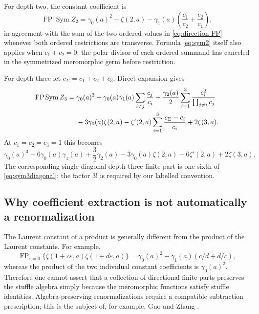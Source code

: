 \documentclass[11pt,letterpaper]{article}
\numberwithin{equation}{section}
\theoremstyle{plain}
\theoremstyle{definition}
\theoremstyle{remark}
\DeclareMathOperator{\FP}{FP}
\DeclareMathOperator{\Sym}{Sym}
\newcommand{\eps}{\varepsilon}
\begin{document}
For depth two, the constant coefficient is
\begin{equation}\label{eq:sym2}
 \FP\Sym Z_2
 =\gamma_0(a)^2-\zeta(2,a)
        -\gamma_1(a)\left(\frac{c_1}{c_2}+\frac{c_2}{c_1}\right),
\end{equation}
in agreement with the sum of the two ordered values in
\eqref{eq:direction-FP} whenever both ordered restrictions are
transverse. Formula \eqref{eq:sym2} itself also applies when
$c_1+c_2=0$: the polar divisor of each ordered summand has canceled
in the symmetrized meromorphic germ before restriction.

For depth three let $c_\Sigma=c_1+c_2+c_3$. Direct expansion gives
\begin{align}\label{eq:sym3}
 \FP\Sym Z_3={}&\gamma_0(a)^3
   -\gamma_0(a)\gamma_1(a)\sum_{i\ne j}\frac{c_j}{c_i}
   +\frac{\gamma_2(a)}2\sum_{i=1}^3
                         \frac{c_i^2}{\prod_{j\ne i}c_j}\notag\\
 &-3\gamma_0(a)\zeta(2,a)
   -\zeta'(2,a)\sum_{i=1}^3\frac{c_\Sigma-c_i}{c_i}
   +2\zeta(3,a).
\end{align}
At $c_1=c_2=c_3=1$ this becomes
\begin{equation}\label{eq:sym3diagonal}
 \gamma_0(a)^3-6\gamma_0(a)\gamma_1(a)+\frac32\gamma_2(a)
 -3\gamma_0(a)\zeta(2,a)-6\zeta'(2,a)+2\zeta(3,a).
\end{equation}
The corresponding single diagonal depth-three finite part is one
sixth of \eqref{eq:sym3diagonal}; the factor $3!$ is required by our
labelled convention.

\subsection{Why coefficient extraction is not automatically a renormalization}

The Laurent constant of a product is generally different from the
product of the Laurent constants. For example,
\begin{equation}\label{eq:FPnonmult}
 \FP_{\eps=0}\bigl\{\zeta(1+c\eps,a)\zeta(1+d\eps,a)\bigr\}
 =\gamma_0(a)^2-\gamma_1(a)(c/d+d/c),
\end{equation}
whereas the product of the two individual constant coefficients is
$\gamma_0(a)^2$. Therefore one cannot assert that a collection of
directional finite parts preserves the stuffle algebra simply because
the meromorphic functions satisfy stuffle identities. Algebra-preserving
renormalizations require a compatible subtraction prescription; this is
the subject of, for example, Guo and Zhang \cite{guozhang}.
\end{document}
